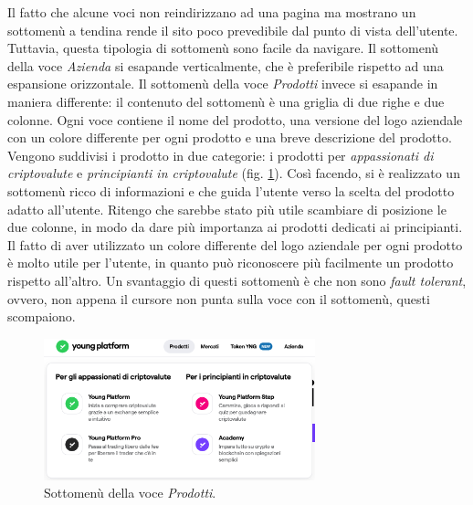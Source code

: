 Il fatto che alcune voci non reindirizzano ad una pagina ma mostrano un 
sottomenù a tendina rende il sito poco prevedibile dal punto di vista 
dell'utente. Tuttavia, questa tipologia di sottomenù sono facile da 
navigare. Il sottomenù della voce \textit{Azienda} si esapande 
verticalmente, che è preferibile rispetto ad una espansione orizzontale. 
Il sottomenù della voce \textit{Prodotti} invece si esapande in maniera 
differente: il contenuto del sottomenù è una griglia di due righe e due 
colonne. Ogni voce contiene il nome del prodotto, una versione del logo 
aziendale con un colore differente per ogni prodotto e una breve 
descrizione del prodotto. Vengono suddivisi i prodotto in due categorie: 
i prodotti per \textit{appassionati di criptovalute} e 
\textit{principianti in criptovalute} (fig. \ref{fig:products-submenu}). 
Così facendo, si è realizzato un sottomenù ricco di informazioni e che 
guida l'utente verso la scelta del prodotto adatto all'utente. Ritengo che 
sarebbe stato più utile scambiare di posizione le due colonne, in modo da 
dare più importanza ai prodotti dedicati ai principianti. Il fatto di 
aver utilizzato un colore differente del logo aziendale per ogni prodotto 
è molto utile per l'utente, in quanto può riconoscere più facilmente un 
prodotto rispetto all'altro. Un svantaggio di questi sottomenù è che non 
sono \textit{fault tolerant}, ovvero, non appena il cursore non punta sulla 
voce con il sottomenù, questi scompaiono.
\begin{figure}[H]
  \centering
  \includegraphics[width=0.70\textwidth]{res/images/products-submenu.png}
  \caption{Sottomenù della voce \textit{Prodotti}.}
  \label{fig:products-submenu}
\end{figure}